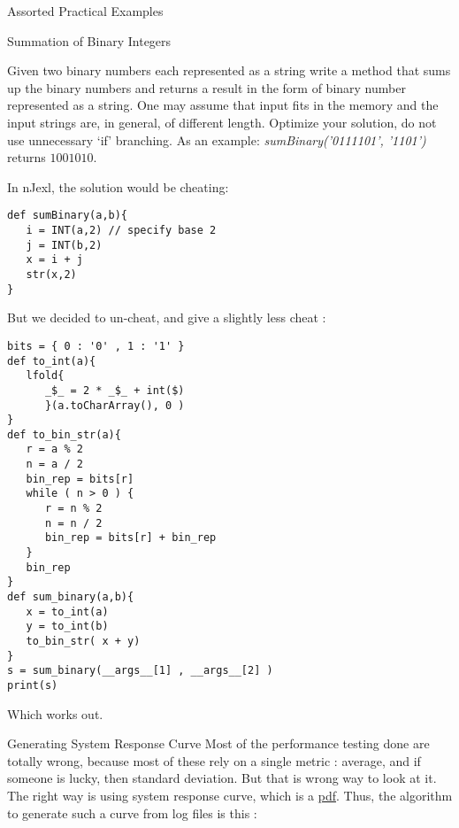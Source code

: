 \begin{section}{Assorted Practical Examples}
\begin{subsection}{Summation of Binary Integers}

Given two binary numbers each represented as a string write a method that sums up the binary numbers 
and returns a result in the form of binary number represented as a string. 
One may assume that input fits in the memory and the input strings are, in general, of different length. 
Optimize your solution, do not use unnecessary `if' branching. 
As an example: \emph{sumBinary('0111101', '1101')} returns  $1001010$.

In nJexl, the solution would be cheating:
\begin{center}\begin{minipage}{\linewidth}
\begin{lstlisting}[style=JexlStyle]
def sumBinary(a,b){
   i = INT(a,2) // specify base 2 
   j = INT(b,2)
   x = i + j 
   str(x,2)
}
\end{lstlisting}  
\end{minipage}\end{center}

But we decided to un-cheat, and give a slightly less cheat :

\begin{center}\begin{minipage}{\linewidth}
\begin{lstlisting}[style=JexlStyle]
bits = { 0 : '0' , 1 : '1' } 
def to_int(a){
   lfold{  
      _$_ = 2 * _$_ + int($)  
      }(a.toCharArray(), 0 )
} 
def to_bin_str(a){
   r = a % 2
   n = a / 2 
   bin_rep = bits[r]
   while ( n > 0 ) {
      r = n % 2 
      n = n / 2 
      bin_rep = bits[r] + bin_rep 
   }
   bin_rep 
} 
def sum_binary(a,b){
   x = to_int(a)
   y = to_int(b)
   to_bin_str( x + y)
}
s = sum_binary(__args__[1] , __args__[2] )
print(s)
\end{lstlisting}  
\end{minipage}\end{center}

Which works out. 
\end{subsection}

\begin{subsection}{Generating System Response Curve}
Most of the performance testing done are totally wrong, because 
most of these rely on a single metric : average, and if someone is lucky, 
then standard deviation. But that is wrong way to look at it.
The right way is using system response curve, which is a 
\href{https://en.wikipedia.org/wiki/Probability\_distribution\_function}{pdf}.
Thus, the algorithm to generate such a curve from log files is this :


\end{subsection}
\end{section}
